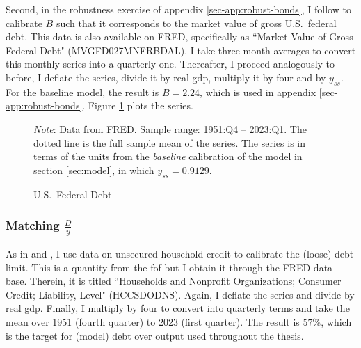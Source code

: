 \documentclass[a4paper,12pt]{article} %
\numberwithin{equation}{section} %
\numberwithin{figure}{section}
\numberwithin{table}{section}
\begin{document}
\begin{refsection}
\begin{appendices}
Second, in the robustness exercise of appendix \ref{sec-app:robust-bonds}, I follow \textcite{bayer2023} to calibrate $B$ such that it corresponds to the market value of gross U.S.~federal debt. This data is also available on FRED, specifically as ``Market Value of Gross Federal Debt" (MVGFD027MNFRBDAL). I take three-month averages to convert this monthly series into a quarterly one. Thereafter, I proceed analogously to before, I deflate the series, divide it by real \Gls{gdp}, multiply it by four and by $y_{ss}$. For the baseline model, the result is $B=2.24$, which is used in appendix \ref{sec-app:robust-bonds}. Figure \ref{fig:app-calibration-bonds} plots the series.

\begin{figure}[H]
    \centering
    \caption{U.S.~Federal Debt}
    \label{fig:app-calibration-bonds}
    

    \vspace{10pt}
    
    \begin{minipage}{0.75\textwidth} 
    \footnotesize
    \textit{Note}: Data from \href{https://fred.stlouisfed.org}{FRED}. Sample range: 1951:Q4 -- 2023:Q1. The dotted line is the full sample mean of the series. The series is in terms of the units from the \textit{baseline} calibration of the model in section \ref{sec:model}, in which $y_{ss} = 0.9129$.
    \end{minipage}
\end{figure}

\subsubsection*{Matching $\frac{D}{y}$}

As in \textcite{gl2017} and \textcite{bayer2023}, I use data on unsecured household credit to calibrate the (loose) debt limit. This is a quantity from the \Gls{fof} but I obtain it through the FRED data base. Therein, it is titled ``Households and Nonprofit Organizations; Consumer Credit; Liability, Level" (HCCSDODNS). Again, I deflate the series and divide by real \Gls{gdp}. Finally, I multiply by four to convert into quarterly terms and take the mean over 1951 (fourth quarter) to 2023 (first quarter). The result is $57\%$, which is the target for (model) debt over output used throughout the thesis. 


\end{appendices}
\end{refsection}
\end{document}
